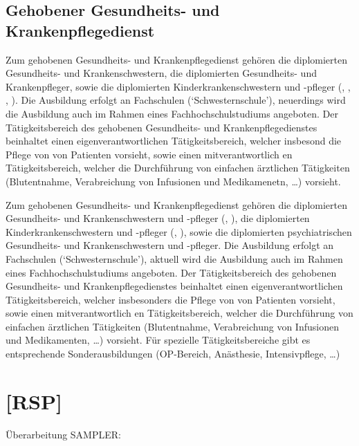 \documentclass[
ngerman,
paper=a4,
asymmetric,
fontsize=10pt,
draft=false,
numbers=noenddot,
bibtotocnumbered,
footnotes=multiple,
]{scrreprt}
\newcommand{\jALT}{\vspace{6pt}\noindent{\color{red}\sffamily\textbf{DELETED}\hrulefill\newline}}
\newcommand{\jALTende}{\newline{\color{red}\rule{\linewidth}{2pt}\newline}}
\newcommand{\jNEU}{\vspace{6pt}\noindent{\color{green}\sffamily\textbf{ADDED}\hrulefill\newline}}
\newcommand{\jNEUende}{\newline{\color{green}\rule{\linewidth}{3pt}\newline}}
\begin{document}
 \subsection{Gehobener Gesundheits- und Krankenpflegedienst}
 
 \jALT
 Zum gehobenen Gesundheits- und Krankenpflegedienst gehören
die diplomierten Gesundheits- und Krankenschwestern, die
diplomierten Gesundheits- und Krankenpfleger, sowie die
diplomierten Kinderkrankenschwestern und -pfleger (,
, , ). 
 Die Ausbildung erfolgt
an Fachschulen (\enquote*{Schwesternschule}), neuerdings
 wird die Ausbildung auch im Rahmen eines Fachhochschulstudiums angeboten. 
 Der Tätigkeitsbereich des gehobenen Gesundheits- und
 Krankenpflegedienstes beinhaltet einen
 eigenverantwortlichen 
Tätigkeitsbereich, welcher insbesond die Pflege von
 von Patienten vorsieht, sowie einen mitverantwortlich en
 Tätigkeitsbereich, welcher die Durchführung von einfachen
 ärztlichen Tätigkeiten (Blutentnahme, Verabreichung von
Infusionen und Medikamenetn, \ldots) vorsieht.
\jALTende

\jNEU
 Zum gehobenen Gesundheits- und Krankenpflegedienst gehören
die diplomierten Gesundheits- und Krankenschwestern und
-pfleger (,
),
die diplomierten Kinderkrankenschwestern und -pfleger 
(, ), sowie die diplomierten
psychiatrischen Gesundheits- und
Krankenschwestern und -pfleger.
 Die Ausbildung erfolgt
an Fachschulen (\enquote*{Schwesternschule}), aktuell
 wird die Ausbildung auch im Rahmen eines Fachhochschulstudiums angeboten. 
 Der Tätigkeitsbereich des gehobenen Gesundheits- und
 Krankenpflegedienstes beinhaltet einen
 eigenverantwortlichen 
Tätigkeitsbereich, welcher insbesonders die Pflege von
 von Patienten vorsieht, sowie einen mitverantwortlich en
 Tätigkeitsbereich, welcher die Durchführung von einfachen
 ärztlichen Tätigkeiten (Blutentnahme, Verabreichung von
Infusionen und Medikamenten, \ldots) vorsieht. 
Für spezielle Tätigkeitsbereiche gibt es entsprechende
Sonderausbildungen (OP-Bereich, Anästhesie, Intensivpflege,
\ldots)
\jNEUende

\section{[RSP]}
Überarbeitung SAMPLER:
\end{document}
